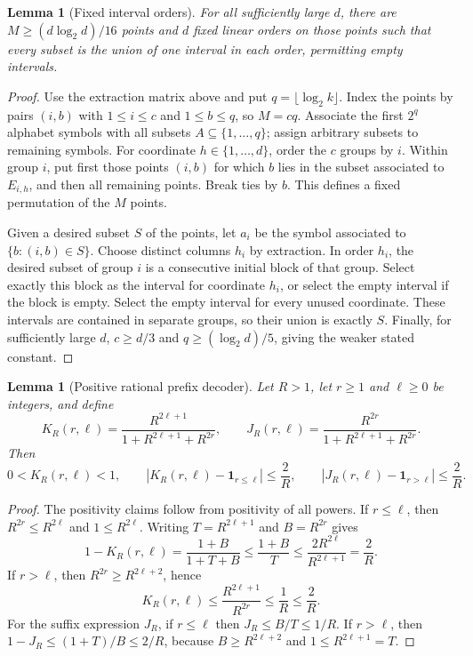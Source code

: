 \documentclass[11pt]{article}
\newtheorem{lemma}[theorem]{Lemma}
\newcommand{\1}{\mathbf 1}
\begin{document}
\begin{lemma}[Fixed interval orders]
For all sufficiently large $d$, there are $M\geq (d\log_2 d)/16$ points and
$d$ fixed linear orders on those points such that every subset is the union
of one interval in each order, permitting empty intervals.
\end{lemma}
\begin{proof}
Use the extraction matrix above and put $q=\lfloor\log_2 k\rfloor$.
Index the points by pairs $(i,b)$ with $1\leq i\leq c$ and $1\leq b\leq q$,
so $M=cq$. Associate the first $2^q$ alphabet symbols with all subsets
$A\subseteq\{1,\ldots,q\}$; assign arbitrary subsets to remaining symbols.
For coordinate $h\in\{1,\ldots,d\}$, order the $c$ groups by $i$.
Within group $i$, put first those points $(i,b)$ for which $b$ lies in the
subset associated to $E_{i,h}$, and then all remaining points. Break ties by
$b$. This defines a fixed permutation of the $M$ points.

Given a desired subset $S$ of the points, let $a_i$ be the symbol associated
to $\{b:(i,b)\in S\}$. Choose distinct columns $h_i$ by extraction. In
order $h_i$, the desired subset of group $i$ is a consecutive initial block
of that group. Select exactly this block as the interval for coordinate
$h_i$, or select the empty interval if the block is empty. Select the empty
interval for every unused coordinate. These intervals are contained in
separate groups, so their union is exactly $S$.
Finally, for sufficiently large $d$,
$c\geq d/3$ and $q\geq (\log_2 d)/5$, giving the weaker stated constant.
\end{proof}

\begin{lemma}[Positive rational prefix decoder]
Let $R>1$, let $r\geq1$ and $\ell\geq0$ be integers, and define
\[
 K_R(r,\ell)=\frac{R^{2\ell+1}}{1+R^{2\ell+1}+R^{2r}},\qquad
 J_R(r,\ell)=\frac{R^{2r}}{1+R^{2\ell+1}+R^{2r}}.
\]
Then
\[
 0<K_R(r,\ell)<1,\qquad
 \left|K_R(r,\ell)-\1_{r\leq\ell}\right|\leq\frac2R,\qquad
 \left|J_R(r,\ell)-\1_{r>\ell}\right|\leq\frac2R.
\]
\end{lemma}
\begin{proof}
The positivity claims follow from positivity of all powers.
If $r\leq\ell$, then $R^{2r}\leq R^{2\ell}$ and
$1\leq R^{2\ell}$. Writing $T=R^{2\ell+1}$ and $B=R^{2r}$ gives
\[
 1-K_R(r,\ell)=\frac{1+B}{1+T+B}
 \leq\frac{1+B}{T}\leq\frac{2R^{2\ell}}{R^{2\ell+1}}=\frac2R.
\]
If $r>\ell$, then $R^{2r}\geq R^{2\ell+2}$, hence
\[
 K_R(r,\ell)\leq\frac{R^{2\ell+1}}{R^{2r}}\leq\frac1R\leq\frac2R.
\]
For the suffix expression $J_R$, if $r\leq\ell$ then $J_R\leq B/T\leq1/R$.
If $r>\ell$, then $1-J_R\leq(1+T)/B\leq2/R$, because
$B\geq R^{2\ell+2}$ and $1\leq R^{2\ell+1}=T$.
\end{proof}
\end{document}
